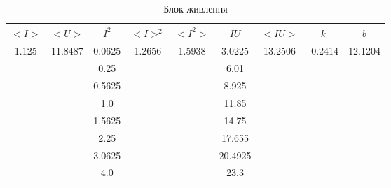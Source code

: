 \documentclass[a4paper,12pt]{article}
\begin{document}
	\begin{table}[h]
		\centering
		\caption{Блок живлення}
		\begin{tabular}{|c|c|c|c|c|c|c|c|c|}
			\hline
			\textbf{$<I>$}         & \textbf{$<U>$}           & \textbf{$I^2$} & \textbf{$<I>^2$}        & \textbf{$<I^2>$}        & \textbf{$IU$} & \textbf{$<IU>$}          & \textbf{$k$}             & \textbf{$b$}             \\ \hline
			\multirow{8}{*}{1.125} & \multirow{8}{*}{11.8487} & 0.0625         & \multirow{8}{*}{1.2656} & \multirow{8}{*}{1.5938} & 3.0225        & \multirow{8}{*}{13.2506} & \multirow{8}{*}{-0.2414} & \multirow{8}{*}{12.1204} \\ \cline{3-3} \cline{6-6}
			&                          & 0.25           &                         &                         & 6.01          &                          &                          &                          \\ \cline{3-3} \cline{6-6}
			&                          & 0.5625         &                         &                         & 8.925         &                          &                          &                          \\ \cline{3-3} \cline{6-6}
			&                          & 1.0            &                         &                         & 11.85         &                          &                          &                          \\ \cline{3-3} \cline{6-6}
			&                          & 1.5625         &                         &                         & 14.75         &                          &                          &                          \\ \cline{3-3} \cline{6-6}
			&                          & 2.25           &                         &                         & 17.655        &                          &                          &                          \\ \cline{3-3} \cline{6-6}
			&                          & 3.0625         &                         &                         & 20.4925       &                          &                          &                          \\ \cline{3-3} \cline{6-6}
			&                          & 4.0            &                         &                         & 23.3          &                          &                          &                          \\ \hline
		\end{tabular}
	\end{table}
\end{document}
